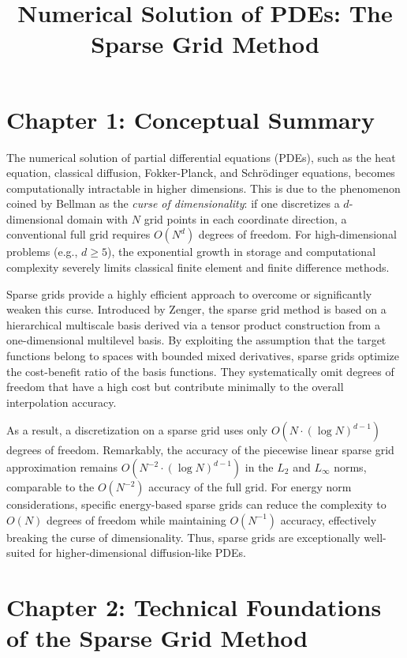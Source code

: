 \documentclass[12pt, a4paper]{article}
\title{Numerical Solution of PDEs: The Sparse Grid Method}
\author{}
\date{}
\begin{document}
\maketitle

\section{Chapter 1: Conceptual Summary}

The numerical solution of partial differential equations (PDEs), such as the heat equation, classical diffusion, Fokker-Planck, and Schrödinger equations, becomes computationally intractable in higher dimensions. This is due to the phenomenon coined by Bellman as the \textit{curse of dimensionality}: if one discretizes a $d$-dimensional domain with $N$ grid points in each coordinate direction, a conventional full grid requires $O(N^d)$ degrees of freedom. For high-dimensional problems (e.g., $d \ge 5$), the exponential growth in storage and computational complexity severely limits classical finite element and finite difference methods. 

Sparse grids provide a highly efficient approach to overcome or significantly weaken this curse. Introduced by Zenger, the sparse grid method is based on a hierarchical multiscale basis derived via a tensor product construction from a one-dimensional multilevel basis. By exploiting the assumption that the target functions belong to spaces with bounded mixed derivatives, sparse grids optimize the cost-benefit ratio of the basis functions. They systematically omit degrees of freedom that have a high cost but contribute minimally to the overall interpolation accuracy.

As a result, a discretization on a sparse grid uses only $O(N \cdot (\log N)^{d-1})$ degrees of freedom. Remarkably, the accuracy of the piecewise linear sparse grid approximation remains $O(N^{-2} \cdot (\log N)^{d-1})$ in the $L_2$ and $L_\infty$ norms, comparable to the $O(N^{-2})$ accuracy of the full grid. For energy norm considerations, specific energy-based sparse grids can reduce the complexity to $O(N)$ degrees of freedom while maintaining $O(N^{-1})$ accuracy, effectively breaking the curse of dimensionality. Thus, sparse grids are exceptionally well-suited for higher-dimensional diffusion-like PDEs.

\section{Chapter 2: Technical Foundations of the Sparse Grid Method}
\end{document}
